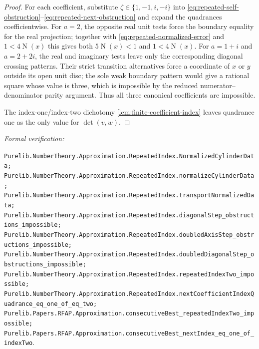 \documentclass[11pt]{article}
\newcommand{\Norm}[1]{\operatorname{N}\!\left(#1\right)}
\newcommand{\leanref}[1]{\par\smallskip\noindent
  \emph{Formal verification:}\par\nobreak
  {\raggedright\nolinkurl{#1}.\par}}
\begin{document}
\begin{proof}
For each coefficient, substitute $\zeta\in\{1,-1,i,-i\}$ into
\eqref{eq:repeated-self-obstruction}--\eqref{eq:repeated-next-obstruction}
and expand the quadrances coefficientwise.  For $a=2$, the opposite real
unit tests force the boundary equality for the real projection; together
with \eqref{eq:repeated-normalized-error} and $1<4\Norm x$ this gives both
$5\Norm x<1$ and $1<4\Norm x$.  For $a=1+i$ and $a=2+2i$, the real and
imaginary tests leave only the corresponding diagonal crossing patterns.
Their strict transition alternatives force a coordinate of $x$ or $y$
outside its open unit disc; the sole weak boundary pattern would give a
rational square whose value is three, which is impossible by the reduced
numerator--denominator parity argument.  Thus all three canonical
coefficients are impossible.

The index-one/index-two dichotomy
\cref{lem:finite-coefficient-index} leaves quadrance one as the only value
for $\det(v,w)$.
\end{proof}

\leanref{Purelib.NumberTheory.Approximation.RepeatedIndex.NormalizedCylinderData;
Purelib.NumberTheory.Approximation.RepeatedIndex.normalizeCylinderData;
Purelib.NumberTheory.Approximation.RepeatedIndex.transportNormalizedData;
Purelib.NumberTheory.Approximation.RepeatedIndex.diagonalStep_obstructions_impossible;
Purelib.NumberTheory.Approximation.RepeatedIndex.doubledAxisStep_obstructions_impossible;
Purelib.NumberTheory.Approximation.RepeatedIndex.doubledDiagonalStep_obstructions_impossible;
Purelib.NumberTheory.Approximation.RepeatedIndex.repeatedIndexTwo_impossible;
Purelib.NumberTheory.Approximation.RepeatedIndex.nextCoefficientIndexQuadrance_eq_one_of_eq_two;
Purelib.Papers.RFAP.Approximation.consecutiveBest_repeatedIndexTwo_impossible;
Purelib.Papers.RFAP.Approximation.consecutiveBest_nextIndex_eq_one_of_indexTwo}
\end{document}
